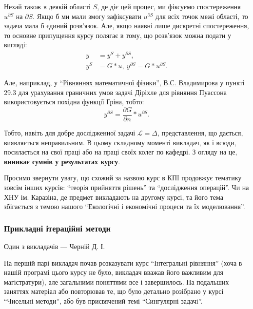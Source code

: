 \documentclass[14pt, a4paper]{extarticle}  %
\begin{document}
Нехай також в деякій області $S$, де діє цей процес, ми фіксуємо спостереження $u^{\partial S}$ на $\partial S$. Якщо б ми мали змогу зафіксувати $u^{\partial S}$ для всіх точок межі області, то задача мала б єдиний розв'язок. Але, якщо наявні лише дискретні спостереження, то основне припущення курсу полягає в тому, що розв'язок можна подати у вигляді:
\begin{align*}
   y &= y^S + y^{\partial S}, \\
   y^S &= G * u, \ y^{\partial S} = G * u^{\partial S}.
\end{align*}

Але, наприклад, у \href{http://cmcstuff.esyr.org/vmkbotva-r15/4\%20\%D0\%BA\%D1\%83\%D1\%80\%D1\%81/8\%20\%D0\%A1\%D0\%B5\%D0\%BC\%D0\%B5\%D1\%81\%D1\%82\%D1\%80/PDE\%20Extra\%20Chapters\%20\%5BHapaev\%20M.M.\%5D/\%D0\%92.\%D0\%A1.\%20\%D0\%92\%D0\%BB\%D0\%B0\%D0\%B4\%D0\%B8\%D0\%BC\%D0\%B8\%D1\%80\%D0\%BE\%D0\%B2.\%20\%D0\%A3\%D1\%80\%D0\%B0\%D0\%B2\%D0\%BD\%D0\%B5\%D0\%BD\%D0\%B8\%D1\%8F\%20\%D0\%BC\%D0\%B0\%D1\%82\%D0\%B5\%D0\%BC\%D0\%B0\%D1\%82\%D0\%B8\%D1\%87\%D0\%B5\%D1\%81\%D0\%BA\%D0\%BE\%D0\%B9\%20\%D1\%84\%D0\%B8\%D0\%B7\%D0\%B8\%D0\%BA\%D0\%B8.pdf}{``Рівняннях математичної фізики'', В.С. Владимирова} у пункті 29.3 для урахування граничних умов задачі Діріхле для рівняння Пуассона використовується похідна функції Гріна, тобто:
\[ y^{\partial S} = \frac{\partial G}{\partial n} * u^{\partial S}. \]

Тобто, навіть для добре дослідженної задачі $\mathcal{L} = \Delta$, представлення, що дається, виявляється неправильним. В цьому складному моменті викладач, як і всюди, посилається на свої праці або на праці своїх колег по кафедрі. З огляду на це, \textbf{виникає сумнів у результатах курсу}. \medskip

Просимо звернути увагу, що схожий за назвою курс в КПІ продовжує тематику зовсім інших курсів: ``теорія прийняття рішень'' та ``дослідження операцій''. Чи на ХНУ ім. Каразіна, де предмет викладають на другому курсі, та його тема збігається з темою нашого ``Екологічні і економічні процеси та їх моделювання''. %

\subsubsection{Прикладні ітераційні методи}
Один з викладачів --- Черній Д. І.

На першій парі викладач почав розказувати курс ``Інтегральні рівняння'' (хоча в нашій програмі цього курсу не було, викладач вважав його важливим для магістратури), але загальними поняттями все і завершилось. На подальших заняттях матеріал або повторював те, що було детально розібрано у курсі ``Чисельні методи'', або був присвячений темі ``Сингулярні задачі''.
\end{document}
